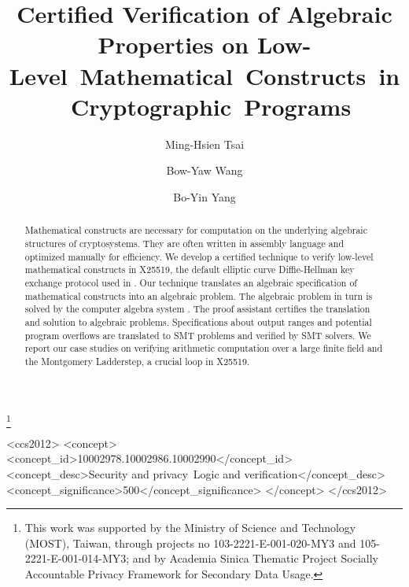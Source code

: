 \documentclass[sigconf]{acmart}
\begin{document}
\title{Certified Verification of Algebraic Properties on
Low- \mbox{Level Mathematical Constructs in Cryptographic Programs}}

\author{Ming-Hsien Tsai}

\author{Bow-Yaw Wang}

\author{Bo-Yin Yang}

\renewcommand{\shortauthors}{M.-H. Tsai et al.}

\thanks{This work was supported by the Ministry of Science and Technology (MOST), Taiwan, through projects no 103-2221-E-001-020-MY3 and 105-2221-E-001-014-MY3; and by Academia Sinica Thematic Project Socially Accountable Privacy Framework for Secondary Data Usage.}

\begin{abstract}
  Mathematical constructs are necessary for computation on the
  underlying algebraic structures of cryptosystems. They are often
  written in assembly language and optimized manually for
  efficiency. We develop a certified technique to verify low-level mathematical
  constructs in X25519, the default elliptic curve Diffie-Hellman key
  exchange protocol used in \openssh. Our technique translates an
  algebraic specification of mathematical constructs into an algebraic
  problem. The algebraic
  problem in turn is solved by the computer algebra system \singular.
  The proof assistant
  \coq certifies the translation and solution to algebraic
  problems.
  Specifications about output ranges and potential program overflows are translated to SMT problems and verified by SMT solvers.
  We report our case studies on verifying
  arithmetic computation over a large finite field and
  the Montgomery Ladderstep, a crucial loop in X25519.
\end{abstract}

%
%
\begin{CCSXML}
<ccs2012>
<concept>
<concept_id>10002978.10002986.10002990</concept_id>
<concept_desc>Security and privacy~Logic and verification</concept_desc>
<concept_significance>500</concept_significance>
</concept>
</ccs2012>
\end{CCSXML}
\end{document}
